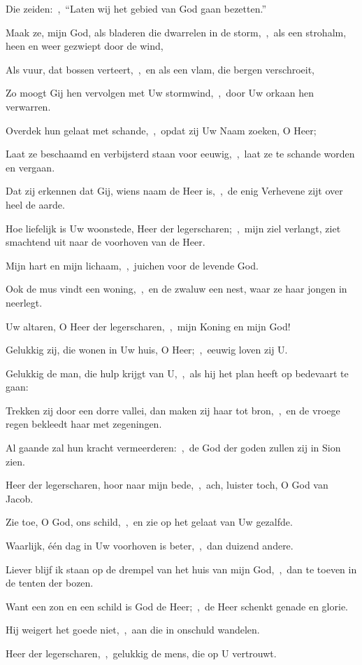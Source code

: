 \documentclass[12pt,twoside,a5paper]{article}
\begin{document}
\begin{halfparskip}
  Die zeiden:~\sep\ ``Laten wij het gebied van God gaan bezetten.''

  Maak ze, mijn God, als bladeren die dwarrelen in de storm,~\sep\ als een strohalm, heen en weer gezwiept door de wind,

  Als vuur, dat bossen verteert,~\sep\ en als een vlam, die bergen verschroeit,

  Zo moogt Gij hen vervolgen met Uw stormwind,~\sep\ door Uw orkaan hen verwarren.

  Overdek hun gelaat met schande,~\sep\ opdat zij Uw Naam zoeken, O Heer;

  Laat ze beschaamd en verbijsterd staan voor eeuwig,~\sep\ laat ze te schande worden en vergaan.

  Dat zij erkennen dat Gij, wiens naam de Heer is,~\sep\ de enig Verhevene zijt over heel de aarde.

   Hoe liefelijk is Uw woonstede, Heer der legerscharen;~\sep\ mijn ziel verlangt, ziet smachtend uit naar de voorhoven van de Heer.

  Mijn hart en mijn lichaam,~\sep\ juichen voor de levende God.

  Ook de mus vindt een woning,~\sep\ en de zwaluw een nest, waar ze haar jongen in neerlegt.

  Uw altaren, O Heer der legerscharen,~\sep\ mijn Koning en mijn God!

  Gelukkig zij, die wonen in Uw huis, O Heer;~\sep\ eeuwig loven zij U.

  Gelukkig de man, die hulp krijgt van U,~\sep\ als hij het plan heeft op bedevaart te gaan:

  Trekken zij door een dorre vallei, dan maken zij haar tot bron,~\sep\ en de vroege regen bekleedt haar met zegeningen.

  Al gaande zal hun kracht vermeerderen:~\sep\ de God der goden zullen zij in Sion zien.

  Heer der legerscharen, hoor naar mijn bede,~\sep\ ach, luister toch, O God van Jacob.

  Zie toe, O God, ons schild,~\sep\ en zie op het gelaat van Uw gezalfde.

  Waarlijk, één dag in Uw voorhoven is beter,~\sep\ dan duizend andere.

  Liever blijf ik staan op de drempel van het huis van mijn God,~\sep\ dan te toeven in de tenten der bozen.

  Want een zon en een schild is God de Heer;~\sep\ de Heer schenkt genade en glorie.

  Hij weigert het goede niet,~\sep\ aan die in onschuld wandelen.

  Heer der legerscharen,~\sep\ gelukkig de mens, die op U vertrouwt.
\end{halfparskip}
\end{document}
